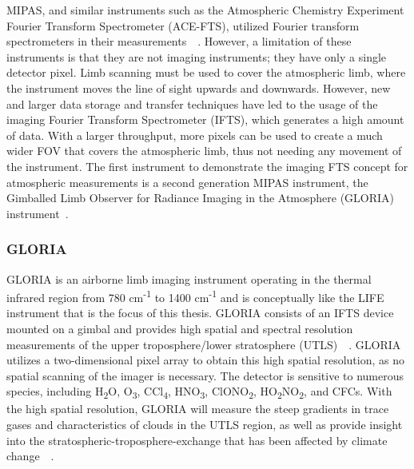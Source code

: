 MIPAS, and similar instruments such as the Atmospheric Chemistry Experiment Fourier Transform Spectrometer (ACE-FTS), utilized Fourier transform spectrometers in their measurements~\cite{SPARC}~\cite{ACE_conference}. However, a limitation of these instruments is that they are not imaging instruments; they have only a single detector pixel. Limb scanning must be used to cover the atmospheric limb, where the instrument moves the line of sight upwards and downwards. However, new and larger data storage and transfer techniques have led to the usage of the imaging Fourier Transform Spectrometer (IFTS), which generates a high amount of data. With a larger throughput, more pixels can be used to create a much wider FOV that covers the atmospheric limb, thus not needing any movement of the instrument. The first instrument to demonstrate the imaging FTS concept for atmospheric measurements is a second generation MIPAS instrument, the Gimballed Limb Observer for Radiance Imaging in the Atmosphere (GLORIA) instrument~\cite{GLORIA_concept}.

\subsubsection{GLORIA}
GLORIA is an airborne limb imaging instrument operating in the thermal infrared region from 780 cm\textsuperscript{-1} to 1400 cm\textsuperscript{-1} and is conceptually like the LIFE instrument that is the focus of this thesis. GLORIA consists of an IFTS device mounted on a gimbal and provides high spatial and spectral resolution measurements of the upper troposphere/lower stratosphere (UTLS)~\cite{GLORIA_concept}~\cite{GLORIA_PhD}. GLORIA utilizes a two-dimensional pixel array to obtain this high spatial resolution, as no spatial scanning of the imager is necessary. The detector is sensitive to numerous species, including H\textsubscript{2}O, O\textsubscript{3}, CCl\textsubscript{4}, HNO\textsubscript{3}, ClONO\textsubscript{2}, HO\textsubscript{2}NO\textsubscript{2}, and CFCs. With the high spatial resolution, GLORIA will measure the steep gradients in trace gases and characteristics of clouds in the UTLS region, as well as provide insight into the stratospheric-troposphere-exchange that has been affected by climate change~\cite{GLORIA_PhD}~\cite{GLORIA_objectives}.

